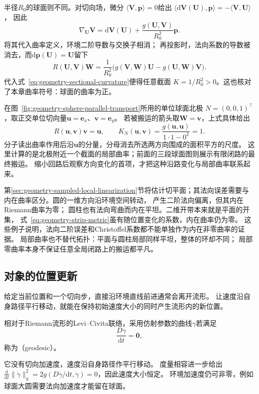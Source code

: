 半径$R_0$的球面则不同。对切向场，微分
$\langle\bm V,\bm p\rangle=0$给出
$\langle\mathrm d\bm V(\bm U),\bm p\rangle=-\langle\bm V,\bm U\rangle$，
因此
\[
 \nabla_{\bm U}\bm V
 =\mathrm d\bm V(\bm U)+\frac{g(\bm U,\bm V)}{R_0^2}\bm p.
\]
将其代入曲率定义，环境二阶导数与交换子相消；
再投影时，法向系数的导数被消去，而$\mathrm d\bm p(\bm U)=\bm U$留下
\[
 R(\bm U,\bm V)\bm W
 =\frac1{R_0^2}\bigl(g(\bm V,\bm W)\bm U-g(\bm U,\bm W)\bm V\bigr).
\]
代入式~\eqref{eq:geometry-sectional-curvature}便得任意截面
$K=1/R_0^2>0$。这也核对了本章曲率符号：球面的曲率为正。

在图~\ref{fig:geometry-sphere-parallel-transport}所用的单位球面北极
$N=(0,0,1)^\top$，取正交单位切向量$\bm u=\bm e_x$、$\bm v=\bm e_y$。
若被搬运的箭头取$\bm W=\bm v$，上式具体给出
\[
 R(\bm u,\bm v)\bm v=\bm u,\qquad
 K_N(\bm u,\bm v)=
 \frac{g(\bm u,\bm u)}{1\cdot1-0^2}=1.
\]
分子读出曲率作用后沿$\bm u$的分量，分母消去所选两方向围成的面积平方的尺度。
这里计算的是北极附近一个截面的局部曲率；前面的三段球面图则展示有限闭路的最终搬运。
缩小回路后观察方向变化的首项，才把这种沿路变化与局部曲率联系起来。

第\ref{sec:geometry-sampled-local-linearization}节将估计切平面；其法向误差需要与内在曲率区分。圆的一维方向沿环境空间转动，
产生二阶法向偏离，但其内在Riemann曲率为零；
圆柱也有法向弯曲而内在平坦。二维开带本来就是平面的开集，
式~\eqref{eq:geometry-strip-metric}虽有随位置变化的系数，内在曲率仍为零。
这些例子说明，法向二阶误差和Christoffel系数都不能单独作为内在非零曲率的证据。
局部曲率也不替代拓扑：平面与圆柱局部同样平坦，整体的环却不同；
局部零曲率本身不保证任意全局闭路上的搬运都平凡。

\subsection{对象的位置更新}
\label{sec:geometry-position-updates}
\label{sec:geometry-geodesic-motion-minimization}

\label{sec:geometry-geodesic-motion}

给定当前位置和一个切向步，直接沿环境直线前进通常会离开流形。
让速度沿自身路径平行移动，就能在保持初始速度大小的同时产生流形内的新位置。

\begin{definition}[测地线]
\label{def:geometry-geodesic}
相对于Riemann流形的Levi--Civita联络，采用仿射参数的曲线$\gamma$若满足
\[
 \frac{D\dot\gamma}{\mathrm dt}=\bm0,
\]
称为（geodesic）。
\end{definition}
它没有切向加速度，速度沿自身路径作平行移动。
度量相容进一步给出
$\frac{\mathrm d}{\mathrm dt}\lVert\dot\gamma\rVert_g^2
=2g(D\dot\gamma/\mathrm dt,\dot\gamma)=0$，因此速度大小恒定。
环境加速度仍可非零，例如球面大圆需要法向加速度才能留在球面。

